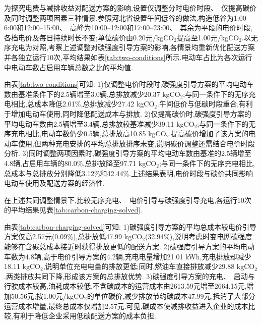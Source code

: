 \documentclass{setp-new}
\begin{document}
为探究电费与减排收益对配送方案的影响,设置仅调整分时电价时段、~仅提高碳价及同时调整两项因素三种情景.参照河北省设置午间低谷的做法\cite{ref:hebei-tou},构造低谷为1:00--6:00和12:00--15:00、~高峰为10:00--12:00和17:00--23:00、~其余为平段的电价时段,各档电价及每日持续时长不变;单位碳价由0.20元/kgCO$_2$提高至1.00元/kgCO$_2$.以无序充电为对照,考察上述调整对碳强度引导方案的影响,各情景均重新优化配送方案并各独立运行10次,平均结果如表\ref{tab:two-conditions}所示.电动车占比为各次运行中电动车数占启用车辆总数之比的平均值.

\begingroup
\small
\noindent\begin{minipage}{\linewidth}
\centering
{}\label{tab:two-conditions}

\end{minipage}
\par\endgroup

由表\ref{tab:two-conditions}可知: 1)仅调整电价时段时,碳强度引导方案的平均电动车数由基准条件下的2.5辆增至3.0辆,总排放减少20.37 kgCO$_2$;与同一条件下的无序充电相比,总成本降低2.01\%,总排放减少27.42 kgCO$_2$.午间低价与低碳时段重合,有利于增加电动车使用,同时降低配送成本与排放. 2)仅提高碳价时,碳强度引导方案的平均电动车数由2.5辆增至3.4辆,总排放较基准减少39.11 kgCO$_2$;与同一条件下的无序充电相比,电动车数仍少0.5辆,总排放高10.85 kgCO$_2$.提高碳价增加了该方案的电动车使用,但两种充电安排的平均总排放排序未变,说明碳价调整还需结合电价时段分析. 3)同时调整两项因素时,碳强度引导方案的平均电动车数由基准的2.5辆增至4.8辆,占启用车辆的80.0\%,总排放降至97.71 kgCO$_2$;与同一条件下的无序充电相比,总成本与总排放分别降低3.12\%和42.44\%.上述结果表明,电价时段与碳价共同影响电动车使用及配送方案的经济性.

在上述共同调整情景下,比较无序充电、~电价引导与碳强度引导充电,各运行10次的平均结果见表\ref{tab:carbon-charging-solved}.

\begingroup
\small
\noindent\begin{minipage}{\linewidth}
\centering
{}\label{tab:carbon-charging-solved}

\end{minipage}
\par\endgroup

由表\ref{tab:carbon-charging-solved}可知: 1)碳强度引导方案的平均总成本较电价引导方案仅高2.57元(0.09\%),总排放低47.99 kgCO$_2$(32.94\%),说明考虑时变电网碳强度能够在含碳总成本接近时获得排放更低的配送方案. 2)碳强度引导方案的平均电动车数为4.8辆,高于电价引导方案的4.2辆,充电电量增加21.01 kWh,充电排放却减少18.11 kgCO$_2$,说明单位充电电量的排放更低;同时,燃油车直接排放减少29.88 kgCO$_2$.两类排放共同下降,形成该方案的总排放优势. 3)碳强度引导方案的充电、~启动与行驶成本较高,油耗成本较低.不含碳成本的运营成本由2613.59元增至2664.15元,增加50.56元;按1.00元/kgCO$_2$的单位碳价,减少排放节约碳成本47.99元,抵消了大部分运营成本增量,最终总成本仅增加2.57元.可见,碳成本使减排收益进入企业的成本比较,有利于降低企业采用低碳配送方案的成本负担.
\end{document}
